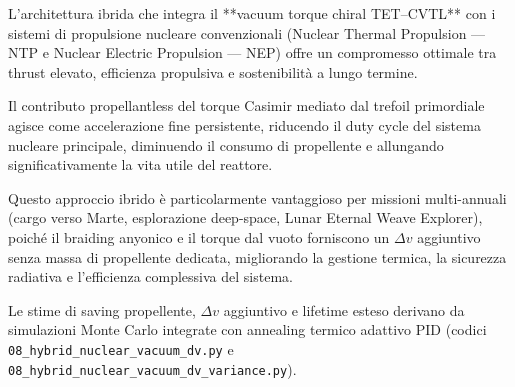 \documentclass[11pt,a4paper]{article}
\theoremstyle{plain}
\theoremstyle{definition}
\begin{document}
\vspace{0.2cm}

L'architettura ibrida che integra il **vacuum torque chiral TET--CVTL** con i sistemi di propulsione nucleare convenzionali (Nuclear Thermal Propulsion — NTP e Nuclear Electric Propulsion — NEP) offre un compromesso ottimale tra thrust elevato, efficienza propulsiva e sostenibilità a lungo termine. 


\vspace{0.3cm}


Il contributo propellantless del torque Casimir mediato dal trefoil primordiale agisce come accelerazione fine persistente, riducendo il duty cycle del sistema nucleare principale, diminuendo il consumo di propellente e allungando significativamente la vita utile del reattore.



\vspace{0.3cm}

Questo approccio ibrido è particolarmente vantaggioso per missioni multi-annuali (cargo verso Marte, esplorazione deep-space, Lunar Eternal Weave Explorer), poiché il braiding anyonico e il torque dal vuoto forniscono un \(\Delta v\) aggiuntivo senza massa di propellente dedicata, migliorando la gestione termica, la sicurezza radiativa e l'efficienza complessiva del sistema. 



\vspace{0.3cm}


Le stime di saving propellente, \(\Delta v\) aggiuntivo e lifetime esteso derivano da simulazioni Monte Carlo integrate con annealing termico adattivo PID (codici \texttt{08\_hybrid\_nuclear\_vacuum\_dv.py} e \texttt{08\_hybrid\_nuclear\_vacuum\_dv\_variance.py}).



\vspace{0.4cm}
\end{document}
